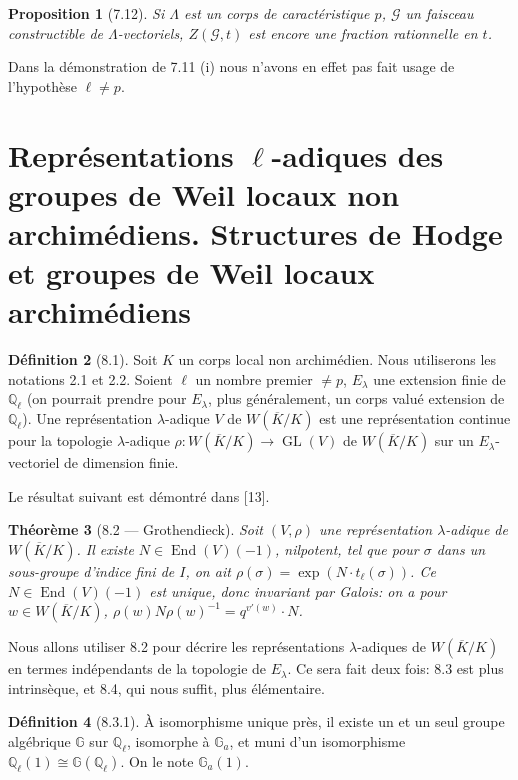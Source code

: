 \documentclass[11pt]{amsart}
\theoremstyle{plain}
\newtheorem{theorem}{Th\'eor\`eme}[section]
\newtheorem{proposition}[theorem]{Proposition}
\theoremstyle{definition}
\newtheorem{definition}[theorem]{D\'efinition}
\DeclareMathOperator{\End}{End}
\DeclareMathOperator{\GL}{GL}
\begin{document}
\begin{proposition}[7.12]
Si $\Lambda$ est un corps de caract\'eristique $p$, $\mathcal{G}$ un faisceau constructible de $\Lambda$-vectoriels, $Z(\mathcal{G},t)$ est encore une fraction rationnelle en $t$.
\end{proposition}
Dans la d\'emonstration de 7.11 (i) nous n'avons en effet pas fait usage de l'hypoth\`ese $\ell \not= p$.


\section{Repr\'esentations $\ell$-adiques des groupes de Weil locaux non archim\'ediens. Structures de Hodge et groupes de Weil locaux archim\'ediens}

\begin{definition}[8.1]
Soit $K$ un corps local non archim\'edien. Nous utiliserons les notations 2.1 et 2.2. Soient $\ell$ un nombre premier $\not= p$, $E_\lambda$ une extension finie de $\mathbb{Q}_\ell$ (on pourrait prendre pour $E_\lambda$, plus g\'en\'eralement, un corps valu\'e extension de $\mathbb{Q}_\ell$). Une repr\'esentation $\lambda$-adique $V$ de $W(\overline{K}/K)$ est une repr\'esentation continue pour la topologie $\lambda$-adique $\rho: W(\overline{K}/K) \to \GL(V)$ de $W(\overline{K}/K)$ sur un $E_\lambda$-vectoriel de dimension finie.
\end{definition}

Le r\'esultat suivant est d\'emontr\'e dans [13].

\begin{theorem}[8.2 --- Grothendieck]
Soit $(V,\rho)$ une repr\'esentation $\lambda$-adique de $W(\overline{K}/K)$. Il existe $N \in \End(V)(-1)$, nilpotent, tel que pour $\sigma$ dans un sous-groupe d'indice fini de $I$, on ait $\rho(\sigma) = \exp(N \cdot t_\ell(\sigma))$. Ce $N \in \End(V)(-1)$ est unique, donc invariant par Galois: on a pour $w \in W(\overline{K}/K)$, $\rho(w) N \rho(w)^{-1} = q^{v'(w)} \cdot N$.
\end{theorem}

Nous allons utiliser 8.2 pour d\'ecrire les repr\'esentations $\lambda$-adiques de $W(\overline{K}/K)$ en termes ind\'ependants de la topologie de $E_\lambda$. Ce sera fait deux fois: 8.3 est plus intrins\`eque, et 8.4, qui nous suffit, plus \'el\'ementaire.

\begin{definition}[8.3.1]
\`A isomorphisme unique pr\`es, il existe un et un seul groupe alg\'ebrique $\mathbb{G}$ sur $\mathbb{Q}_\ell$, isomorphe \`a $\mathbb{G}_a$, et muni d'un isomorphisme $\mathbb{Q}_\ell(1) \cong \mathbb{G}(\mathbb{Q}_\ell)$. On le note $\mathbb{G}_a(1)$.
\end{definition}
\end{document}
